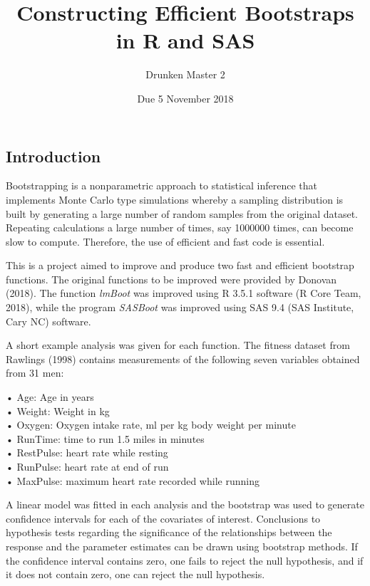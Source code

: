 \documentclass[]{article}
\title{Constructing Efficient Bootstraps in R and SAS}
\author{Drunken Master 2}
\date{Due 5 November 2018}
\begin{document}
\maketitle

{
\setcounter{tocdepth}{3}
\tableofcontents
}
\pagebreak

\subsection{Introduction}\label{introduction}

Bootstrapping is a nonparametric approach to statistical inference that
implements Monte Carlo type simulations whereby a sampling distribution
is built by generating a large number of random samples from the
original dataset. Repeating calculations a large number of times, say
1000000 times, can become slow to compute. Therefore, the use of
efficient and fast code is essential.

This is a project aimed to improve and produce two fast and efficient
bootstrap functions. The original functions to be improved were provided
by Donovan (2018). The function \emph{lmBoot} was improved using R 3.5.1
software (R Core Team, 2018), while the program \emph{SASBoot} was
improved using SAS 9.4 (SAS Institute, Cary NC) software.

A short example analysis was given for each function. The fitness
dataset from Rawlings (1998) contains measurements of the following
seven variables obtained from 31 men:

• Age: Age in years\\
• Weight: Weight in kg\\
• Oxygen: Oxygen intake rate, ml per kg body weight per minute\\
• RunTime: time to run 1.5 miles in minutes\\
• RestPulse: heart rate while resting\\
• RunPulse: heart rate at end of run\\
• MaxPulse: maximum heart rate recorded while running

A linear model was fitted in each analysis and the bootstrap was used to
generate confidence intervals for each of the covariates of interest.
Conclusions to hypothesis tests regarding the significance of the
relationships between the response and the parameter estimates can be
drawn using bootstrap methods. If the confidence interval contains zero,
one fails to reject the null hypothesis, and if it does not contain
zero, one can reject the null hypothesis.
\end{document}
